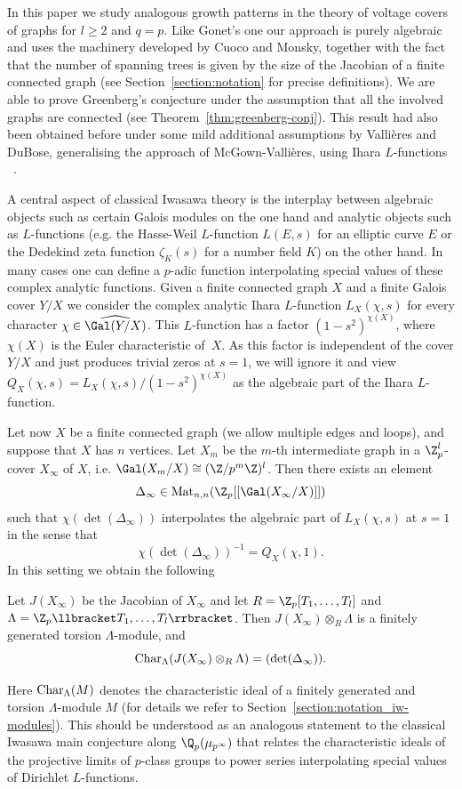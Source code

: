 In this paper we study analogous growth patterns in the theory of voltage covers of graphs for $l\ge2$ and ${q =p}$. Like Gonet's one our approach is purely algebraic and uses the machinery developed by Cuoco and Monsky, together with the fact that the number of spanning trees is given by the size of the Jacobian of a finite connected graph (see Section~\ref{section:notation} for precise definitions). We are able to prove Greenberg's conjecture under the assumption that all the involved graphs are connected (see Theorem~\ref{thm:greenberg-conj}). This result had also been obtained before under some mild additional assumptions by Valli\`eres and DuBose, generalising the approach of McGown-Valli\`eres, using Ihara $L$-functions ~\cite[Theorem~A]{dubose-vallieres}. 

A central aspect of classical Iwasawa theory is the interplay between algebraic objects such as certain Galois modules on the one hand and analytic objects such as $L$-functions (e.g. the Hasse-Weil $L$-function $L(E,s)$ for an elliptic curve $E$ or the Dedekind zeta function $\zeta_K(s)$ for a number field $K$) on the other hand. In many cases one can define a $p$-adic function interpolating special values of these complex analytic functions. Given a finite connected graph $X$ and a finite Galois cover $Y/X$ we consider the complex analytic Ihara $L$-function $L_X(\chi,s)$ for every character ${\chi\in \widehat{\Gal(Y/X)}}$. This $L$-function has a factor $(1-s^2)^{\chi(X)}$, where $\chi(X)$ is the Euler characteristic of~$X$. As this factor is independent of the cover $Y/X$ and just produces trivial zeros at $s=1$, we will ignore it and view ${Q_X(\chi,s)=L_X(\chi,s)/(1-s^2)^{\chi(X)}}$ as the algebraic part of the Ihara $L$-function. 

Let now $X$ be a finite connected graph (we allow multiple edges and loops), and suppose that $X$ has $n$ vertices. Let $X_m$ be the $m$-th intermediate graph in a $\Z_p^l$-cover $X_\infty$ of $X$, i.e. ${\Gal(X_m/X) \cong (\Z/p^m\Z)^l}$. Then there exists an element 
\[ \Delta_\infty\in \textup{Mat}_{n,n}(\Z_p[[\Gal(X_\infty/X)]])\] 
such that $\chi(\det(\Delta_\infty))$ interpolates the algebraic part of $L_X(\chi,s)$ at $s=1$ in the sense that \[\chi(\det(\Delta_\infty))^{-1}=Q_X(\chi,1).\] In this setting we obtain the following 
\begin{theo*}
	Let $J(X_\infty)$ be the Jacobian of $X_\infty$ and let ${R = \Z_p[T_1, \ldots, T_l]}$ and ${\Lambda=\Z_p\llbracket T_1, \ldots, T_l\rrbracket }$. Then ${J(X_\infty) \otimes_R \Lambda}$ is a finitely generated torsion $\Lambda$-module, and 
	\[\textup{Char}_\Lambda(J(X_\infty)\otimes_R \Lambda)=(\det(\Delta_\infty)).\]
\end{theo*}
Here $\textup{Char}_\Lambda(M)$ denotes the characteristic ideal of a finitely generated and torsion $\Lambda$-module $M$ (for details we refer to Section~\ref{section:notation_iw-modules}). This should be understood as an analogous statement to the classical Iwasawa main conjecture along $\Q_p(\mu_{p^\infty})$ that relates the characteristic ideals of the projective limits of $p$-class groups to power series interpolating special values of Dirichlet $L$-functions. 

